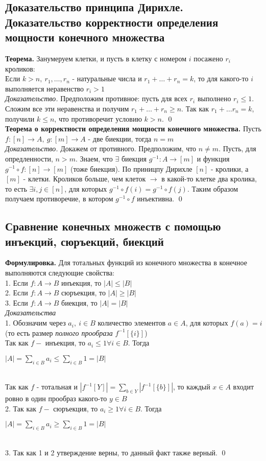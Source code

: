 \documentclass[a4paper]{article}
\begin{document}
\subsection{Доказательство принципа Дирихле. Доказательство корректности определения мощности конечного множества}
\textbf{Теорема.}  Занумеруем клетки, и пусть в клетку с номером $i$ посажено $r_i$ кроликов:\\[2mm]
 Если $k>n,\ r_1,\ldots,r_n$ - натуральные числа и $r_1+\ldots+r_n=k$, то для какого-то $i$ выполняется неравенство $r_i>1$\\[2mm]
\textit{Доказательство.} Предположим противное: пусть для всех $r_i$ выполнено $r_i\leqslant1$. Сложим все эти неравенства и получим $r_1+\ldots+r_n\geqslant n$. Так как $r_1+\ldots r_n=k$, получили $k\leqslant n$, что противоречит условию $k>n$. \qed\\[2mm]
\textbf{Теорема о корректности определения мощности конечного множества.} Пусть $f: [n]\rightarrow A,\ g: [m]\rightarrow A$ - две биекции, тогда $n=m$\\[2mm]
\textit{Доказательство.} Докажем от противного. Предположим, что $n\ne m$. Пусть, для опредленности, $n>m$. Знаем, что $\exists$ биекция $g^{-1}: A\rightarrow [m]$ и функция $g^{-1}\circ f: [n]\rightarrow[m]$ (тоже биекция). По приницпу Дирихле $[n]$ - кролики, а $[m]$ - клетки. Кроликов больше, чем клеток $\rightarrow$ в какой-то клетке два кролика, то есть $\exists i,j\in[n]$, для которых $g^{-1}\circ f(i)=g^{-1}\circ f(j)$. Таким образом получаем противоречие, в котором $g^{-1}\circ f$ инъективна. \qed
\subsection{Сравнение конечных множеств с помощью инъекций, сюръекций, биекций}
\textbf{Формулировка.} Для тотальных функций из конечного множества в конечное выполняются следующие свойства:\\[2mm]
 1. Если $f: A\rightarrow B$ инъекция, то $|A|\leqslant|B|$\\[2mm]
 2. Если $f: A\rightarrow B$ сюръекция, то $|A|\geqslant|B|$\\[2mm]
 3. Если $f: A\rightarrow B$ биекция, то $|A|=|B|$\\[2mm]
\textit{Доказательства}\\[2mm]
 1. Обозначим через $a_i,\ i\in B$ количество элементов $a\in A$, для которых $f(a)=i$ (то есть размер \textit{полного прообраза} $f^{-1}[\{i\}]$)\\[2mm]
Так как $f-$ инъекция, то $a_i\leqslant1\forall i\in B$. Тогда\\[2mm]
\centerline{$|A|=\sum\limits_{i\in B} a_i\leqslant\sum\limits_{i\in B} 1=|B|$}\\[2mm]
Так как $f$ - тотальная и $|f^{-1}[Y]|=\sum\limits_{b\in Y} |f^{-1}[\{b\}]|$, то каждый $x\in A$ входит ровно в один прообраз какого-то $y\in B$\\[2mm]
 2. Так как $f-$ сюръекция, то $a_i\geqslant1\forall i\in B$. Тогда\\[2mm]
\centerline{$|A|=\sum\limits_{i\in B} a_i\geqslant\sum\limits_{i\in B} 1=|B|$}\\[2mm]
 3. Так как 1 и 2 утверждение верны, то данный факт также верный. \qed
\end{document}
